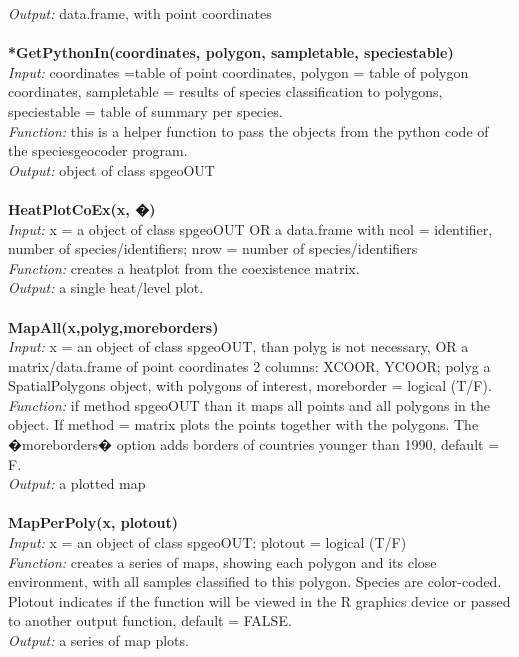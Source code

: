 \documentclass[a4paper,titlepage,11pt]{scrreprt}
\begin{document}
\textit{Output:} data.frame, with point coordinates\\
\\
\textbf{*GetPythonIn(coordinates, polygon, sampletable, speciestable)}\\
\textit{Input:} coordinates =table of point coordinates, polygon = table of polygon coordinates, sampletable = results of species classification to polygons, speciestable = table of summary per species.\\
\textit{Function:} this is a helper function to pass the objects from the python code of the speciesgeocoder program.\\
\textit{Output:} object of class spgeoOUT\\
\\
\textbf{HeatPlotCoEx(x, �)}\\
\textit{Input:} x = a object of class spgeoOUT OR a data.frame with ncol = identifier, number of species/identifiers; nrow = number of species/identifiers\\
\textit{Function:} creates a heatplot from the coexistence matrix.\\
\textit{Output:} a single heat/level plot.\\
\\
\textbf{MapAll(x,polyg,moreborders)}\\
\textit{Input:} x = an object of class spgeoOUT, than polyg is not necessary, OR a matrix/data.frame of point coordinates 2 columns: XCOOR, YCOOR; polyg a SpatialPolygons object, with polygons of interest, moreborder = logical (T/F).\\
\textit{Function:} if method spgeoOUT than it maps all points and all polygons in the object. If method = matrix plots the points together with the polygons. The �moreborders� option adds borders of countries younger than 1990, default = F.\\
\textit{Output:} a plotted map\\
\\
\textbf{MapPerPoly(x, plotout)}\\
\textit{Input:} x = an object of class spgeoOUT; plotout = logical (T/F)\\
\textit{Function:} creates a series of maps, showing each polygon and its close environment, with all samples classified to this polygon. Species are color-coded. Plotout indicates if the function will be viewed in the R graphics device or passed to another output function, default = FALSE. \\
\textit{Output:} a series of map plots.\\
\end{document}
